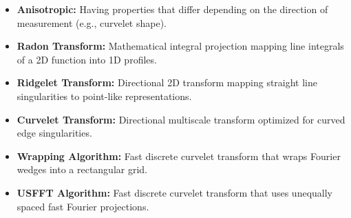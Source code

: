 \documentclass[12pt,a4paper]{article}
\begin{document}
\begin{tcolorbox}[defbox, title={\textbf{One-Line Definitions}}]
\begin{itemize}[leftmargin=*, itemsep=3.5pt]
  \item \textbf{Anisotropic:} Having properties that differ depending on the direction of measurement (e.g., curvelet shape).
  \item \textbf{Radon Transform:} Mathematical integral projection mapping line integrals of a 2D function into 1D profiles.
  \item \textbf{Ridgelet Transform:} Directional 2D transform mapping straight line singularities to point-like representations.
  \item \textbf{Curvelet Transform:} Directional multiscale transform optimized for curved edge singularities.
  \item \textbf{Wrapping Algorithm:} Fast discrete curvelet transform that wraps Fourier wedges into a rectangular grid.
  \item \textbf{USFFT Algorithm:} Fast discrete curvelet transform that uses unequally spaced fast Fourier projections.
\end{itemize}
\end{tcolorbox}
\end{document}
